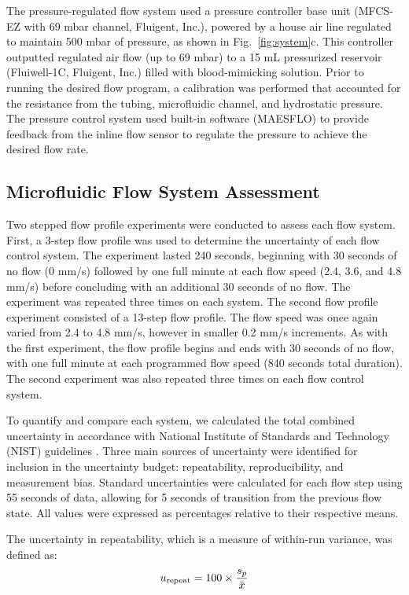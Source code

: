 \documentclass[12pt]{spieman}
\begin{document}
\begin{spacing}{2}
The pressure-regulated flow system used a pressure controller base unit (MFCS-EZ with 69 mbar channel, Fluigent, Inc.), powered by a house air line regulated to maintain 500 mbar of pressure, as shown in Fig.~\ref{fig:system}c. This controller outputted regulated air flow (up to 69 mbar) to a 15 mL pressurized reservoir (Fluiwell-1C, Fluigent, Inc.) filled with blood-mimicking solution. Prior to running the desired flow program, a calibration was performed that accounted for the resistance from the tubing, microfluidic channel, and hydrostatic pressure. The pressure control system used built-in software (MAESFLO) to provide feedback from the inline flow sensor to regulate the pressure to achieve the desired flow rate.


\subsection{Microfluidic Flow System Assessment}

Two stepped flow profile experiments were conducted to assess each flow system. First, a 3-step flow profile was used to determine the uncertainty of each flow control system. The experiment lasted 240 seconds, beginning with 30 seconds of no flow (0 mm/s) followed by one full minute at each flow speed (2.4, 3.6, and 4.8 mm/s) before concluding with an additional 30 seconds of no flow. The experiment was repeated three times on each system. The second flow profile experiment consisted of a 13-step flow profile. The flow speed was once again varied from 2.4 to 4.8 mm/s, however in smaller 0.2 mm/s increments. As with the first experiment, the flow profile begins and ends with 30 seconds of no flow, with one full minute at each programmed flow speed (840 seconds total duration). The second experiment was also repeated three times on each flow control system.

To quantify and compare each system, we calculated the total combined uncertainty in accordance with National Institute of Standards and Technology (NIST) guidelines \cite{Taylor.199438,NIST:2002}. Three main sources of uncertainty were identified for inclusion in the uncertainty budget: repeatability, reproducibility, and measurement bias. Standard uncertainties were calculated for each flow step using 55 seconds of data, allowing for 5 seconds of transition from the previous flow state. All values were expressed as percentages relative to their respective means.

The uncertainty in repeatability, which is a measure of within-run variance, was defined as:
%
\begin{equation}
    \label{eq:u_repeat}
    u_\textnormal{repeat} = 100 \times \frac{s_p}{\bar{x}}
\end{equation}


\end{spacing}
\end{document}
